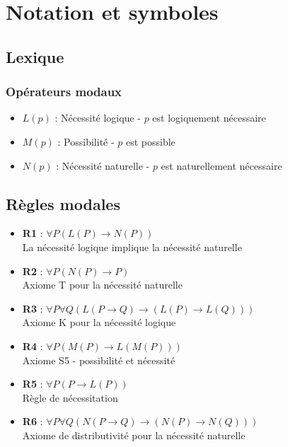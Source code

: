 \documentclass[10pt,a3paper]{article}
\begin{document}
\section{Notation et symboles}

\subsection{Lexique}

\subsubsection{Opérateurs modaux}
\begin{itemize}
    \item $L(p)$ : Nécessité logique - $p$ est logiquement nécessaire
    \item $M(p)$ : Possibilité - $p$ est possible
    \item $N(p)$ : Nécessité naturelle - $p$ est naturellement nécessaire
\end{itemize}

\subsection{Règles modales}
\begin{itemize}
    \item \textbf{R1} : $\forall P (L(P) \rightarrow N(P))$ \\
    La nécessité logique implique la nécessité naturelle
    
    \item \textbf{R2} : $\forall P (N(P) \rightarrow P)$ \\
    Axiome T pour la nécessité naturelle
    
    \item \textbf{R3} : $\forall P \forall Q (L(P \rightarrow Q) \rightarrow (L(P) \rightarrow L(Q)))$ \\
    Axiome K pour la nécessité logique
    
    \item \textbf{R4} : $\forall P (M(P) \rightarrow L(M(P)))$ \\
    Axiome S5 - possibilité et nécessité
    
    \item \textbf{R5} : $\forall P (P \rightarrow L(P))$ \\
    Règle de nécessitation
    
    \item \textbf{R6} : $\forall P \forall Q (N(P \rightarrow Q) \rightarrow (N(P) \rightarrow N(Q)))$ \\
    Axiome de distributivité pour la nécessité naturelle
\end{itemize}
\end{document}
